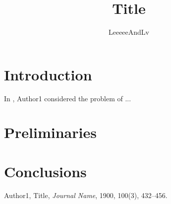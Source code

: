 \documentclass{article}
\title{Title}
\author{LeeeeeAndLv}
\date{}
\begin{document}
\maketitle

\section{Introduction}

In \cite{Au1900}, Author1 considered the problem of ...

\section{Preliminaries}

\section{Conclusions}

\begin{thebibliography}{99}
	Author1, Title, {\it Journal Name}, 1900, 100(3), 432--456.  
\end{thebibliography}
\end{document}
